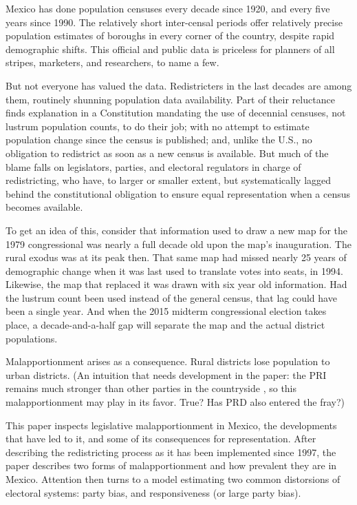 \documentclass[letter,12pt]{article}
\begin{document}
\onehalfspacing

Mexico has done population censuses every decade since 1920, and every five years since 1990. The relatively short inter-censal periods offer relatively precise population estimates of boroughs in every corner of the country, despite rapid demographic shifts. This official and public data is priceless for planners of all stripes, marketers, and researchers, to name a few. 

But not everyone has valued the data. Redistricters in the last decades are among them, routinely shunning population data availability. Part of their reluctance finds explanation in a Constitution mandating the use of decennial censuses, not lustrum population counts, to do their job; with no attempt to estimate population change since the census is published; and, unlike the U.S., no obligation to redistrict as soon as a new census is available. But much of the blame falls on legislators, parties, and electoral regulators in charge of redistricting, who have, to larger or smaller extent, but systematically lagged behind the constitutional obligation to ensure equal representation when a census becomes available. 

To get an idea of this, consider that information used to draw a new map for the 1979 congressional was nearly a full decade old upon the map's inauguration. The rural exodus was at its peak then. That same map had missed nearly 25 years of demographic change when it was last used to translate votes into seats, in 1994. Likewise, the map that replaced it was drawn with six year old information. Had the lustrum count been used instead of the general census, that lag could have been a single year. And when the 2015 midterm congressional election takes place, a decade-and-a-half gap will separate the map and the actual district populations. 

Malapportionment arises as a consequence. Rural districts lose population to urban districts. (An intuition that needs development in the paper: the PRI remains much stronger than other parties in the countryside \citep{amesMex.1970,magar.1994}, so this malapportionment may play in its favor. True? Has PRD also entered the fray?)

This paper inspects legislative malapportionment in Mexico, the developments that have led to it, and some of its consequences for representation. After describing the redistricting process as it has been implemented since 1997, the paper describes two forms of malapportionment and how prevalent they are in Mexico. Attention then turns to a model estimating two common distorsions of electoral systems: party bias, and responsiveness (or large party bias). 
\end{document}

